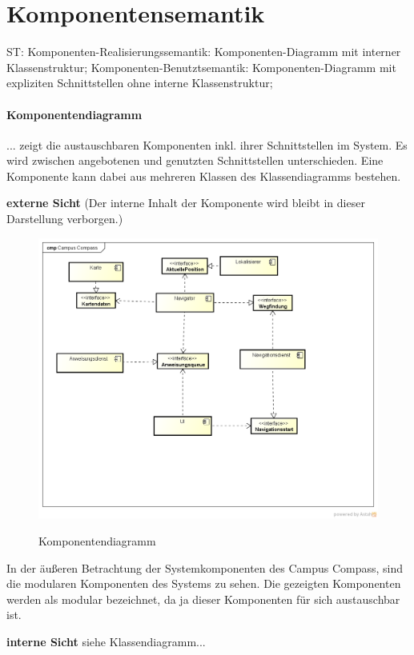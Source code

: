 \chapter{Komponentensemantik}
ST: Komponenten-Realisierungssemantik: Komponenten-Diagramm mit
interner Klassenstruktur;
Komponenten-Benutztsemantik: Komponenten-Diagramm mit expliziten
Schnittstellen ohne interne Klassenstruktur;

\subsubsection*{Komponentendiagramm}
... zeigt die austauschbaren Komponenten inkl. ihrer Schnittstellen im System. Es wird zwischen angebotenen und genutzten Schnittstellen unterschieden. Eine Komponente kann dabei aus mehreren Klassen des Klassendiagramms bestehen.

\textbf{externe Sicht}
(Der interne Inhalt der Komponente wird bleibt in dieser Darstellung verborgen.)
\begin{figure}[hbt]
  \centering
  \includegraphics[width=\linewidth]{img/komponentendiagramm.png}
  \label{img:komponentendiagramm}
  \caption{Komponentendiagramm}
\end{figure}

\noindent In der äußeren Betrachtung der Systemkomponenten des Campus Compass, sind die modularen Komponenten des Systems zu sehen. Die gezeigten Komponenten werden als modular bezeichnet, da ja dieser Komponenten für sich austauschbar ist.

\textbf{interne Sicht}
siehe Klassendiagramm...
